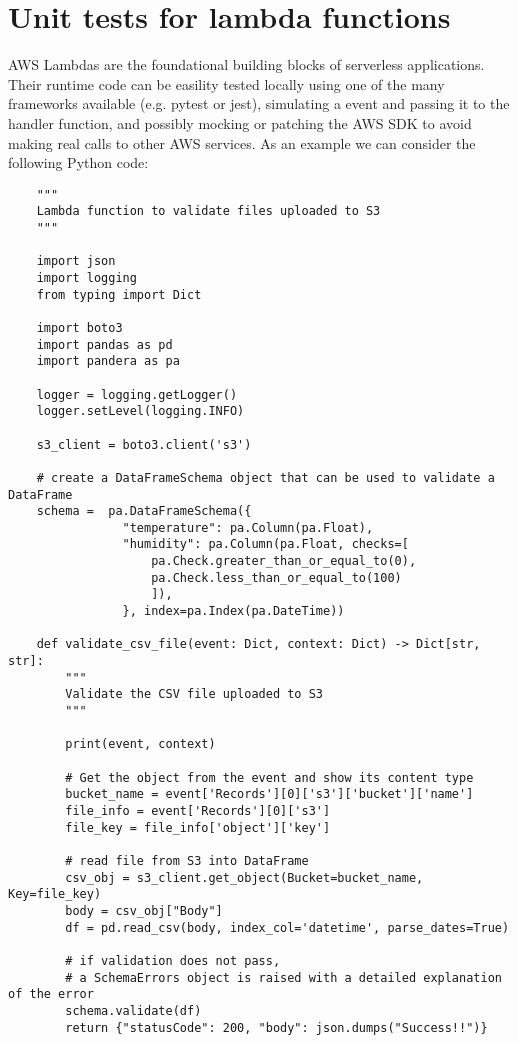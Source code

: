 \documentclass{article}
\begin{document}
\section{Unit tests for lambda functions}

AWS Lambdas are the foundational building blocks of serverless applications.
Their runtime code can be easility tested locally using one of the many frameworks available (e.g. pytest or jest), simulating a event and passing it to the handler function, and possibly mocking or patching the AWS SDK to avoid making real calls to other AWS services. As an example we can consider the following Python code:

\begin{verbatim}
    """
    Lambda function to validate files uploaded to S3
    """

    import json
    import logging
    from typing import Dict

    import boto3
    import pandas as pd
    import pandera as pa

    logger = logging.getLogger()
    logger.setLevel(logging.INFO)

    s3_client = boto3.client('s3')

    # create a DataFrameSchema object that can be used to validate a DataFrame
    schema =  pa.DataFrameSchema({
                "temperature": pa.Column(pa.Float),
                "humidity": pa.Column(pa.Float, checks=[
                    pa.Check.greater_than_or_equal_to(0),
                    pa.Check.less_than_or_equal_to(100)
                    ]),
                }, index=pa.Index(pa.DateTime))

    def validate_csv_file(event: Dict, context: Dict) -> Dict[str, str]:
        """
        Validate the CSV file uploaded to S3
        """

        print(event, context)

        # Get the object from the event and show its content type
        bucket_name = event['Records'][0]['s3']['bucket']['name']
        file_info = event['Records'][0]['s3']
        file_key = file_info['object']['key']

        # read file from S3 into DataFrame
        csv_obj = s3_client.get_object(Bucket=bucket_name, Key=file_key)
        body = csv_obj["Body"]
        df = pd.read_csv(body, index_col='datetime', parse_dates=True)

        # if validation does not pass,
        # a SchemaErrors object is raised with a detailed explanation of the error
        schema.validate(df)
        return {"statusCode": 200, "body": json.dumps("Success!!")}
\end{verbatim}
\end{document}
